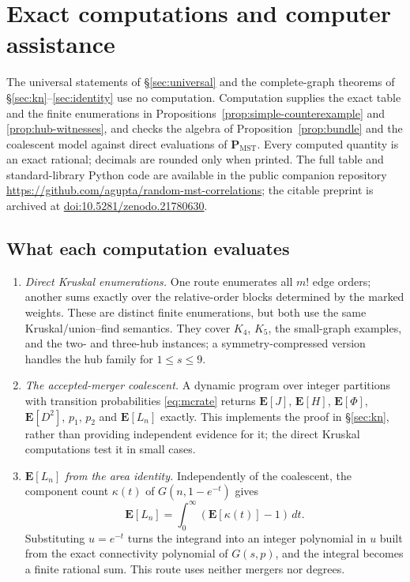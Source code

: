 \documentclass[10pt,a4paper]{amsart}
\newcommand{\PMST}{\mathbf{P}_{\mathrm{MST}}}
\newcommand{\E}{\mathbf{E}}
\begin{document}
\clearpage
\appendix

\section{Exact computations and computer assistance}
\label{sec:verification}

The universal statements of \S\ref{sec:universal} and the complete-graph
theorems of \S\ref{sec:kn}--\ref{sec:identity} use no computation. Computation
supplies the exact table and the finite enumerations in
Propositions~\ref{prop:simple-counterexample} and \ref{prop:hub-witnesses}, and
checks the algebra of Proposition~\ref{prop:bundle} and the coalescent model
against direct evaluations of $\PMST$. Every computed quantity is an exact
rational; decimals are rounded only when printed. The full table and
standard-library Python code are available in the public companion repository
\url{https://github.com/agupta/random-mst-correlations}; the citable preprint is
archived at \href{https://doi.org/10.5281/zenodo.21780630}{doi:10.5281/zenodo.21780630}.

\subsection{What each computation evaluates}

\begin{enumerate}
\item \emph{Direct Kruskal enumerations.} One route enumerates all $m!$ edge
orders; another sums exactly over the relative-order blocks determined by the
marked weights. These are distinct finite enumerations, but both use the same
Kruskal/union--find semantics. They cover $K_4$, $K_5$, the small-graph
examples, and the two- and three-hub instances; a symmetry-compressed version
handles the hub family for $1\le s\le9$.
\item \emph{The accepted-merger coalescent.} A dynamic program over integer
partitions with transition probabilities \eqref{eq:mcrate} returns $\E[J]$,
$\E[H]$, $\E[\Phi]$, $\E[D^2]$, $p_1$, $p_2$ and $\E[L_n]$ exactly. This
implements the proof in \S\ref{sec:kn}, rather than providing independent
evidence for it; the direct Kruskal computations test it in small cases.
\item \emph{$\E[L_n]$ from the area identity.} Independently of the coalescent,
the component count $\kappa(t)$ of $G(n,1-e^{-t})$ gives
\[
  \E[L_n]=\int_0^\infty(\E[\kappa(t)]-1)\,dt.
\]
Substituting $u=e^{-t}$ turns the integrand into an integer polynomial in $u$
built from the exact connectivity polynomial of $G(s,p)$, and the integral
becomes a finite rational sum. This route uses neither mergers nor degrees.
\end{enumerate}
\end{document}

